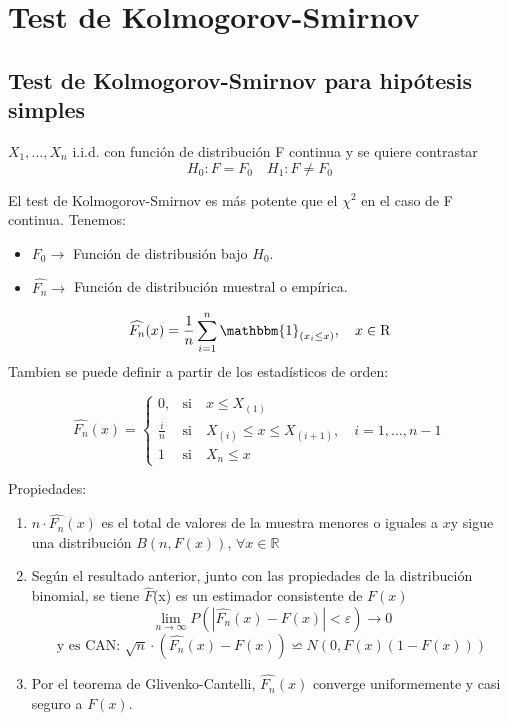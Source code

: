 \section{Test de Kolmogorov-Smirnov}
\subsection{Test de Kolmogorov-Smirnov para hipótesis simples}

$X_1,\dots, X_n$ i.i.d. con función de distribución F continua y se quiere contrastar
\[
    H_0: F=F_0 \quad H_1: F \neq F_0
\]

El test de Kolmogorov-Smirnov es más potente que el $\chi^2$ en el caso de F continua.
Tenemos:
\begin{itemize}
    \item $F_0 \to $ Función de distribusión bajo $H_0$.
    \item $\widehat{F_n} \to$ Función de distribución muestral o empírica.
\end{itemize}
\[
    \widehat{F_n}(x)=\frac{1}{n} \sum_{i=1}^{n} \mathbbm{1}_{(x_i \leq x)}, \quad x \in \mathrm{R}
\]
Tambien se puede definir a partir de los estadísticos de orden:

\[
    \widehat{F_n}(x)=
    \left\{
    \begin{array}{ll}
        0, & \text{si} \quad x \leq X_{(1)}\\
        \frac{i}{n} & \text{si} \quad X_{(i)} \leq x \leq X_{(i+1)}, \quad i=1, \dots,n-1 \\
        1 & \text{si} \quad X_n \leq x
    \end{array}
    \right.
\]

Propiedades:
\begin{enumerate}
    \item $n\cdot \widehat{F_n}(x)$ es el total de valores de la muestra menores o iguales a $x$y sigue una distribución $B(n, F(x))$, $\forall x \in \mathbb{R}$
    \item Según el resultado anterior, junto con las propiedades de la distribución binomial, se tiene $\widehat{F}$(x) es un estimador consistente de $F(x)$
    \[
        \lim_{n \to \infty} P(|\widehat{F_n}(x) - F(x)| < \varepsilon) \to 0
    \]
    \[
        \text{y es CAN: }\sqrt{n}\cdot(\widehat{F_n}(x)-F(x))\backsimeq N(0,F(x)(1-F(x)))
    \]
    \item Por el teorema de Glivenko-Cantelli, $\widehat{F_n}(x)$ converge uniformemente y casi seguro a $F(x)$.
\end{enumerate}

